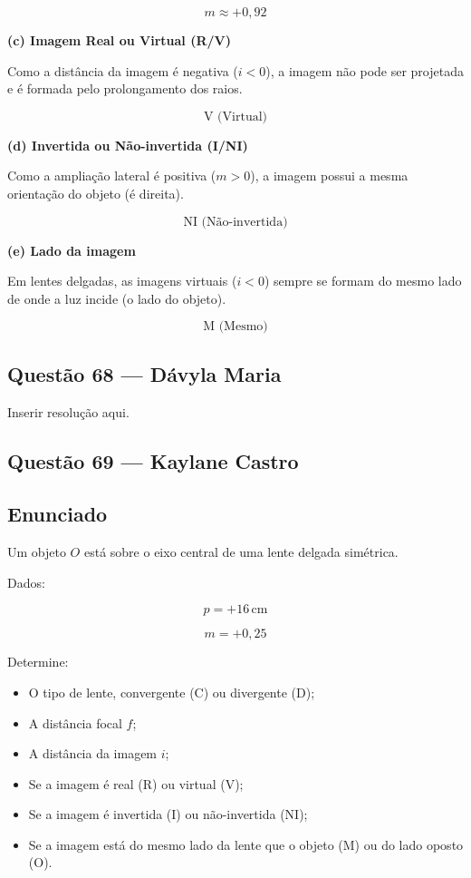 \documentclass[12pt,a4paper]{article}
\begin{document}
\[
\boxed{m \approx +0,92}
\]

\textbf{(c) Imagem Real ou Virtual (R/V)}

Como a distância da imagem é negativa (\(i < 0\)), a imagem não pode ser projetada e é formada pelo prolongamento dos raios.

\[
\boxed{\text{V (Virtual)}}
\]

\textbf{(d) Invertida ou Não-invertida (I/NI)}

Como a ampliação lateral é positiva (\(m > 0\)), a imagem possui a mesma orientação do objeto (é direita).

\[
\boxed{\text{NI (Não-invertida)}}
\]

\textbf{(e) Lado da imagem}

Em lentes delgadas, as imagens virtuais (\(i < 0\)) sempre se formam do mesmo lado de onde a luz incide (o lado do objeto).

\[
\boxed{\text{M (Mesmo)}}
\]


\subsection{Questão 68 — Dávyla Maria}
Inserir resolução aqui.

\subsection{Questão 69 — Kaylane Castro}


\subsection*{Enunciado}

Um objeto $O$ está sobre o eixo central de uma lente delgada simétrica.

Dados:

\[
p = +16\,\text{cm}
\]

\[
m = +0,25
\]

Determine:

\begin{itemize}
    \item[\textbf{(a)}] O tipo de lente, convergente (C) ou divergente (D);
    \item[\textbf{(b)}] A distância focal $f$;
    \item[\textbf{(d)}] A distância da imagem $i$;
    \item[\textbf{(f)}] Se a imagem é real (R) ou virtual (V);
    \item[\textbf{(g)}] Se a imagem é invertida (I) ou não-invertida (NI);
    \item[\textbf{(h)}] Se a imagem está do mesmo lado da lente que o objeto (M) ou do lado oposto (O).
\end{itemize}
\end{document}
